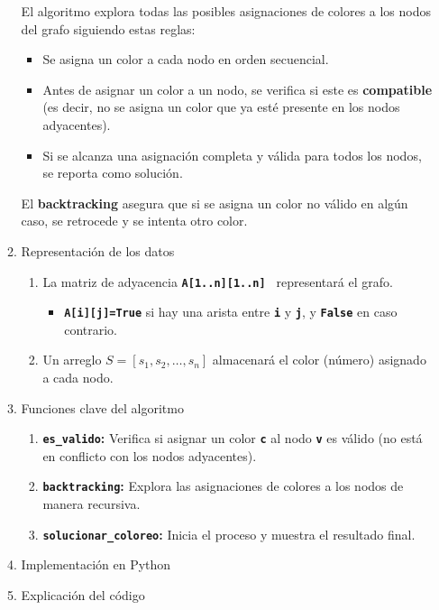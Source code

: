 \begin{enumerate}[label=\color{red}\textbf{\arabic*)}]
\begin{enumerate}[label=\arabic*)]
    El algoritmo explora todas las posibles asignaciones de colores a los nodos del grafo siguiendo estas reglas:
    \begin{itemize}[label=\textbullet]
      \item Se asigna un color a cada nodo en orden secuencial.
      \item Antes de asignar un color a un nodo, se verifica si este es \textbf{compatible} (es decir, no se asigna un color que ya esté presente en los nodos adyacentes).
      \item Si se alcanza una asignación completa y válida para todos los nodos, se reporta como solución.
    \end{itemize}
    El \textbf{backtracking} asegura que si se asigna un color no válido en algún caso, se retrocede y se intenta otro color.
  \item Representación de los datos
    \begin{enumerate}[label=\arabic*)]
      \item La matriz de adyacencia \textbf{\texttt{A[1..n][1..n] }} representará el grafo.
         \begin{itemize}[label=\textbullet]
           \item \textbf{\texttt{A[i][j]=True}} si hay una arista entre \textbf{\texttt{i}} y \textbf{\texttt{j}}, y \textbf{\texttt{False}} en caso contrario.
        \end{itemize}
      \item Un arreglo $S=[s_1,s_2,\dots,s_n]$ almacenará el color (número) asignado a cada nodo.
    \end{enumerate}
  \item Funciones clave del algoritmo
    \begin{enumerate}[label=\arabic*)]
      \item \textbf{\texttt{es\_valido}:} Verifica si asignar un color \textbf{\texttt{c}} al nodo \textbf{\texttt{v}} es válido (no está en conflicto con los nodos adyacentes).
      \item \textbf{\texttt{backtracking}:} Explora las asignaciones de colores a los nodos de manera recursiva.
      \item \textbf{\texttt{solucionar\_coloreo}:} Inicia el proceso y muestra el resultado final. 
    \end{enumerate}
  \item Implementación en Python
    
  \item Explicación del código
    \begin{enumerate}[label=\arabic*)]

\end{enumerate}
\end{enumerate}
\end{enumerate}
